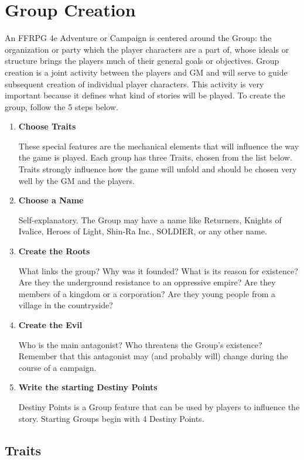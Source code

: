 \section{Group Creation}\label{sec:group}
\begin{multicols}{2}
An FFRPG 4e Adventure or Campaign is centered around the Group: the organization or party which the player characters are a part of, whose ideals or structure brings the players much of their general goals or objectives. Group creation is a joint activity between the players and GM and will serve to guide subsequent creation of individual player characters. This activity is very important because it defines what kind of stories will be played. To create the group, follow the 5 steps below.
\begin{enumerate}

\item \textbf{Choose Traits}

These special features are the mechanical elements that will influence the way the game is played. Each group has three Traits, chosen from the list below. Traits strongly influence how the game will unfold and should be chosen very well by the GM and the players.

\item \textbf{Choose a Name}

Self-explanatory. The Group may have a name like Returners, Knights of Ivalice, Heroes of Light, Shin-Ra Inc., SOLDIER, or any other name.

\item \textbf{Create the Roots}

What links the group? Why was it founded? What is its reason for existence? Are they the underground resistance to an oppressive empire? Are they members of a kingdom or a corporation? Are they young people from a village in the countryside?

\item \textbf{Create the Evil}

Who is the main antagonist? Who threatens the Group’s existence? Remember that this antagonist may (and probably will) change during the course of a campaign.

\item \textbf{Write the starting Destiny Points}

Destiny Points is a Group feature that can be used by players to influence the story. Starting Groups begin with 4 Destiny Points.
\end{enumerate}
\subsection{Traits}\label{subsec:traits}

\end{multicols}
